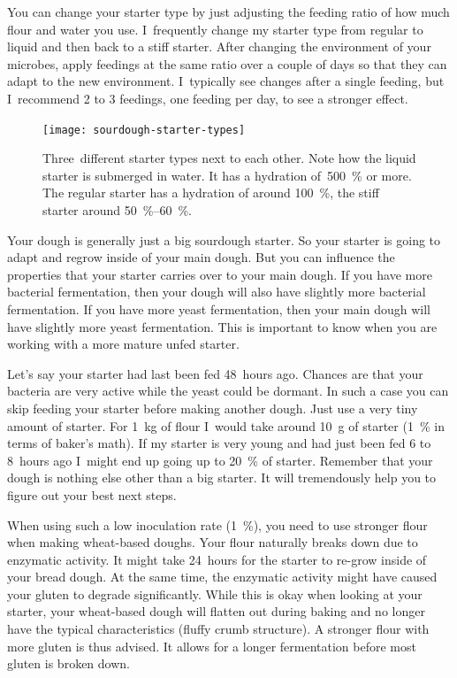 You can change your starter type by just adjusting the feeding ratio of how
much flour and water you use. I~frequently change my starter type from
regular to liquid and then back to a stiff starter. After changing the
environment of your microbes, apply feedings at the same ratio over a couple of
days so that they can adapt to the new environment. I~typically see
changes after a single feeding, but I~recommend 2 to 3 feedings, one feeding per
day, to see a stronger effect.

\begin{figure}[!htb]
  \texttt{[image: sourdough-starter-types]}
  \caption[Liquid, regular and stiff starter]{Three~different starter types
      next to each other. Note how the liquid starter is submerged in water.
      It has a hydration of~\qty{500}{\percent} or more.  The regular starter
      has a hydration of around \qty{100}{\percent}, the stiff starter around
      \qtyrange{50}{60}{\percent}.}%
  \label{fig:starter-types}
\end{figure}

Your dough is generally just a big sourdough starter. So your starter is going
to adapt and regrow inside of your main dough. But you can influence the
properties that your starter carries over to your main dough. If you have more
bacterial fermentation, then your dough will also have slightly more bacterial
fermentation. If you have more yeast fermentation, then your main dough will
have slightly more yeast fermentation. This is important to know when you are
working with a more mature unfed starter.

Let's say your starter had last been
fed 48~hours ago. Chances are that your bacteria are very active while the
yeast could be dormant. In such a case you can skip feeding your starter
before making another dough. Just use a very tiny amount of starter. For
\qty{1}{\kg} of flour I~would take around \qty{10}{\gram} of starter
(\qty{1}{\percent} in terms of baker's
math). If my starter is very young and had just been fed 6 to 8~hours ago I~might
end up going up to \qty{20}{\percent} of starter. Remember that your dough is nothing
else other than a big starter. It will tremendously help you to figure out
your best next steps.

When using such a low inoculation rate (\qty{1}{\percent}), you need to use stronger
flour when making wheat-based doughs. Your flour naturally breaks down due
to enzymatic activity. It might take 24~hours for the starter to re-grow
inside of your bread dough. At the same time, the enzymatic activity might
have caused your gluten to degrade significantly. While this is okay
when looking at your starter, your wheat-based dough will flatten
out during baking and no longer have the typical characteristics (fluffy crumb
structure). A stronger flour with more gluten is thus advised. It allows for
a longer fermentation before most gluten is broken down.

